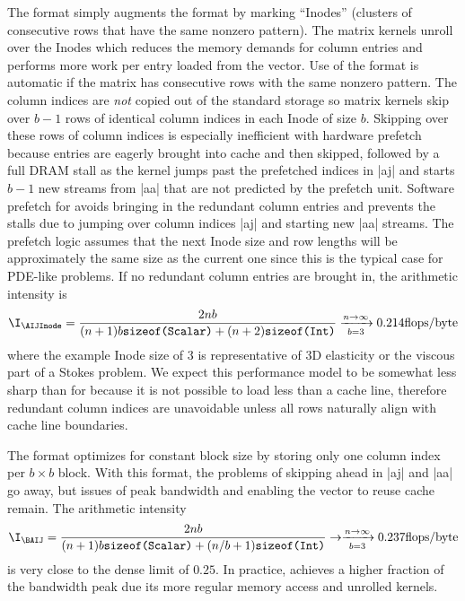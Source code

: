 The {\AIJInode} format simply augments the {\AIJ} format by marking ``Inodes'' (clusters of consecutive rows that have the same nonzero pattern).
The matrix kernels unroll over the Inodes which reduces the memory demands for column entries and performs more work per entry loaded from the vector.
Use of the {\AIJInode} format is automatic if the matrix has consecutive rows with the same nonzero pattern.
The column indices are \emph{not} copied out of the standard {\AIJ} storage so matrix kernels skip over $b-1$ rows of identical column indices in each Inode of size $b$.
Skipping over these rows of column indices is especially inefficient with hardware prefetch because entries are eagerly brought into cache and then skipped, followed by a full DRAM stall as the kernel jumps past the prefetched indices in \cverb|aj| and starts $b-1$ new streams from \cverb|aa| that are not predicted by the prefetch unit.
Software prefetch for {\AIJInode} avoids bringing in the redundant column entries and prevents the stalls due to jumping over column indices \cverb|aj| and starting new \cverb|aa| streams.
The prefetch logic assumes that the next Inode size and row lengths will be approximately the same size as the current one since this is the typical case for PDE-like problems.
If no redundant column entries are brought in, the arithmetic intensity is
\begin{align*}
  \I_{{\AIJInode}} = \frac{2nb}{(n+1)b\texttt{sizeof(Scalar)} + (n+2)\texttt{sizeof(Int)}} \xrightarrow[b=3]{n\to\infty} 0.214 \text{flops/byte}
\end{align*}
where the example Inode size of 3 is representative of 3D elasticity or the viscous part of a Stokes problem.
We expect this performance model to be somewhat less sharp than for {\AIJ} because it is not possible to load less than a cache line, therefore redundant column indices are unavoidable unless all rows naturally align with cache line boundaries.

The {\BAIJ} format optimizes for constant block size by storing only one column index per $b\times b$ block.
With this format, the problems of skipping ahead in \cverb|aj| and \cverb|aa| go away, but issues of peak bandwidth and enabling the vector to reuse cache remain.
The arithmetic intensity
\begin{align*}
  \I_{{\BAIJ}} = \frac{2nb}{(n+1)b\texttt{sizeof(Scalar)} + (n/b+1)\texttt{sizeof(Int)}} \to \xrightarrow[b=3]{n\to\infty} 0.237 \text{flops/byte}
\end{align*}
is very close to the dense limit of $0.25$.
In practice, {\BAIJ} achieves a higher fraction of the bandwidth peak due its more regular memory access and unrolled kernels.

